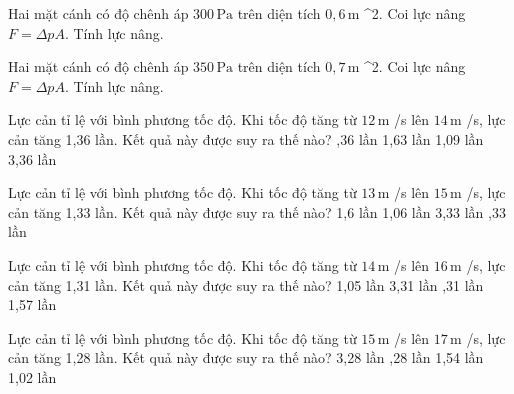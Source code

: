 \begin{bt}
Hai mặt cánh có độ chênh áp $300\,\text{Pa}$ trên diện tích $0,6\,\text{m}$ ^2. Coi lực nâng $F=\Delta pA$. Tính lực nâng.
\end{bt}

\begin{bt}
Hai mặt cánh có độ chênh áp $350\,\text{Pa}$ trên diện tích $0,7\,\text{m}$ ^2. Coi lực nâng $F=\Delta pA$. Tính lực nâng.
\end{bt}

\begin{ex}
Lực cản tỉ lệ với bình phương tốc độ. Khi tốc độ tăng từ $12\,\text{m}$ /s lên $14\,\text{m}$ /s, lực cản tăng 1,36 lần. Kết quả này được suy ra thế nào?
\choice
{,36 lần}
{1,63 lần}
{1,09 lần}
{3,36 lần}
\end{ex}

\begin{ex}
Lực cản tỉ lệ với bình phương tốc độ. Khi tốc độ tăng từ $13\,\text{m}$ /s lên $15\,\text{m}$ /s, lực cản tăng 1,33 lần. Kết quả này được suy ra thế nào?
\choice
{1,6 lần}
{1,06 lần}
{3,33 lần}
{,33 lần}
\end{ex}

\begin{ex}
Lực cản tỉ lệ với bình phương tốc độ. Khi tốc độ tăng từ $14\,\text{m}$ /s lên $16\,\text{m}$ /s, lực cản tăng 1,31 lần. Kết quả này được suy ra thế nào?
\choice
{1,05 lần}
{3,31 lần}
{,31 lần}
{1,57 lần}
\end{ex}

\begin{ex}
Lực cản tỉ lệ với bình phương tốc độ. Khi tốc độ tăng từ $15\,\text{m}$ /s lên $17\,\text{m}$ /s, lực cản tăng 1,28 lần. Kết quả này được suy ra thế nào?
\choice
{3,28 lần}
{,28 lần}
{1,54 lần}
{1,02 lần}
\end{ex}

